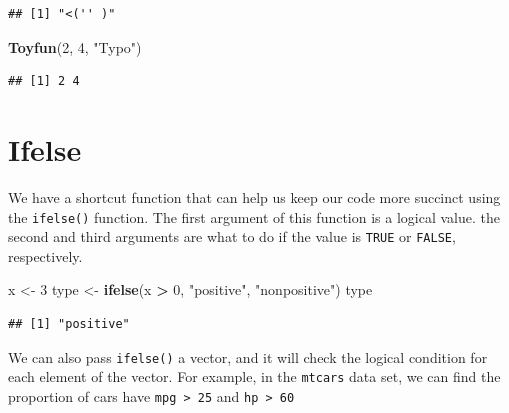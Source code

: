 \documentclass[
]{book}
\newenvironment{Shaded}{\begin{snugshade}}{\end{snugshade}}
\newcommand{\DecValTok}[1]{\textcolor[rgb]{0.00,0.00,0.81}{#1}}
\newcommand{\KeywordTok}[1]{\textcolor[rgb]{0.13,0.29,0.53}{\textbf{#1}}}
\newcommand{\NormalTok}[1]{#1}
\newcommand{\OperatorTok}[1]{\textcolor[rgb]{0.81,0.36,0.00}{\textbf{#1}}}
\newcommand{\OtherTok}[1]{\textcolor[rgb]{0.56,0.35,0.01}{#1}}
\newcommand{\StringTok}[1]{\textcolor[rgb]{0.31,0.60,0.02}{#1}}
\begin{document}
\begin{verbatim}
## [1] "<('' )"
\end{verbatim}

\begin{Shaded}
\begin{Highlighting}[]
\KeywordTok{Toyfun}\NormalTok{(}\DecValTok{2}\NormalTok{, }\DecValTok{4}\NormalTok{, }\StringTok{"Typo"}\NormalTok{)}
\end{Highlighting}
\end{Shaded}

\begin{verbatim}
## [1] 2 4
\end{verbatim}

\hypertarget{ifelse}{%
\section{Ifelse}\label{ifelse}}

We have a shortcut function that can help us keep our code more succinct using the \texttt{ifelse()} function. The first argument of this function is a logical value. the second and third arguments are what to do if the value is \texttt{TRUE} or \texttt{FALSE}, respectively.

\begin{Shaded}
\begin{Highlighting}[]
\NormalTok{x <-}\StringTok{ }\DecValTok{3}
\NormalTok{type <-}\StringTok{ }\KeywordTok{ifelse}\NormalTok{(x }\OperatorTok{>}\StringTok{ }\DecValTok{0}\NormalTok{, }\StringTok{"positive"}\NormalTok{, }\StringTok{"nonpositive"}\NormalTok{)}
\NormalTok{type}
\end{Highlighting}
\end{Shaded}

\begin{verbatim}
## [1] "positive"
\end{verbatim}

We can also pass \texttt{ifelse()} a vector, and it will check the logical condition for each element of the vector. For example, in the \texttt{mtcars} data set, we can find the proportion of cars have \texttt{mpg\ \textgreater{}\ 25} and \texttt{hp\ \textgreater{}\ 60}

\begin{Shaded}
\end{Shaded}
\end{document}
